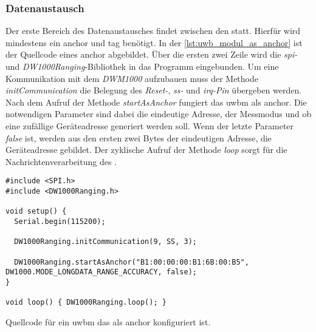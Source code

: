 \subsubsection{Datenaustausch}

Der erste Bereich des Datenaustausches findet zwischen den  statt. Hierfür wird mindestens ein \Gls{anchor} und \Gls{tag} benötigt. In der \autoref{lst:uwb_modul_as_anchor} ist der Quellcode eines \Gls{anchor} abgebildet.
Über die ersten zwei Zeile wird die \textit{\Gls{spi}-} und \textit{DW1000Ranging}-Bibliothek in das Programm eingebunden.
Um eine Kommunikation mit dem \textit{DWM1000} aufzubauen muss der Methode \textit{initCommunication} die Belegung des \textit{Reset-}, \textit{\Gls{ss}-} und \textit{\Gls{irq}-Pin} übergeben werden.
Nach dem Aufruf der Methode \textit{startAsAnchor} fungiert das \Gls{uwbm} als \Gls{anchor}. Die notwendigen Parameter sind dabei die eindeutige Adresse, der Messmodus und ob eine zufällige Geräteadresse generiert werden soll. Wenn der letzte Parameter \textit{false} ist, werden aus den ersten zwei Bytes der eindeutigen Adresse, die Geräteadresse gebildet. Der zyklische Aufruf der Methode \textit{loop} sorgt für die Nachrichtenverarbeitung des .

\begin{listing}
	\begin{verbatim}
#include <SPI.h>
#include <DW1000Ranging.h>

void setup() {
  Serial.begin(115200);

  DW1000Ranging.initCommunication(9, SS, 3);
  
  DW1000Ranging.startAsAnchor("B1:00:00:00:B1:6B:00:B5", DW1000.MODE_LONGDATA_RANGE_ACCURACY, false);
}

void loop() { DW1000Ranging.loop(); }
	\end{verbatim}
	\unskip
	\caption{Quellcode für ein \Gls{uwbm} das als \Gls{anchor} konfiguriert ist.}
	\label{lst:uwb_modul_as_anchor}
\end{listing}

